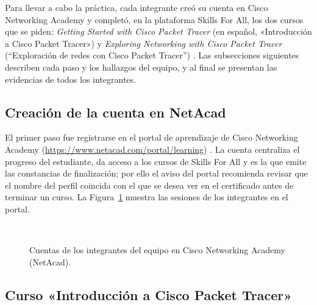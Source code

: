 Para llevar a cabo la práctica, cada integrante creó su cuenta en Cisco Networking Academy y completó, en la plataforma Skills For All, los dos cursos que se piden: \emph{Getting Started with Cisco Packet Tracer} (en español, «Introducción a Cisco Packet Tracer») y \emph{Exploring Networking with Cisco Packet Tracer} (``Exploración de redes con Cisco Packet Tracer'') \cite{skillsforall:getting-started-pt:2026, skillsforall:exploring-networking-pt:2026}. Las subsecciones siguientes describen cada paso y los hallazgos del equipo, y al final se presentan las evidencias de todos los integrantes.

\subsection{Creación de la cuenta en NetAcad}
\label{sec:prac04:cuenta}

El primer paso fue registrarse en el portal de aprendizaje de Cisco Networking Academy (\url{https://www.netacad.com/portal/learning}) \cite{netacad:portal:2026}. La cuenta centraliza el progreso del estudiante, da acceso a los cursos de Skills For All y es la que emite las constancias de finalización; por ello el aviso del portal recomienda revisar que el nombre del perfil coincida con el que se desea ver en el certificado antes de terminar un curso. La Figura~\ref{fig:prac04:cuentas} muestra las sesiones de los integrantes en el portal.

\begin{figure}[H]
    \centering
    \hfill
    \\[1.2em]
    \hfill
    \caption{Cuentas de los integrantes del equipo en Cisco Networking Academy (NetAcad).}
    \label{fig:prac04:cuentas}
\end{figure}

\subsection{Curso «Introducción a Cisco Packet Tracer»}
\label{sec:prac04:curso-intro}

